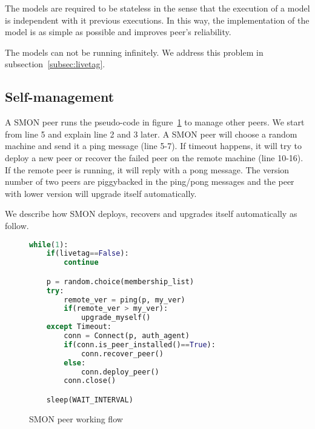 {The models are required to be stateless in the sense that
the execution of a model is independent with it previous
executions. In this way, the implementation of the model is
as simple as possible and improves peer's reliability.



The models can not be running infinitely. We address this
problem in subsection~\ref{subsec:livetag}.
}

\subsection{Self-management}

A SMON peer runs the pseudo-code in
figure~\ref{fig:peerflow} to manage other peers. We start
from line 5 and explain line 2 and 3 later. A SMON peer will
choose a random machine and send it a ping message (line
5-7). If timeout happens, it will try to deploy a new peer
or recover the failed peer on the remote machine (line
10-16). If the remote peer is running, it will reply with a
pong message. The version number of two peers are
piggybacked in the ping/pong messages and the peer with
lower version will upgrade itself automatically.

We describe how SMON deploys, recovers and upgrades itself
automatically as follow.


\begin{figure}
\centering
\begin{lstlisting}[language=Python,morekeywords={True,False},frame=tb,basicstyle=\footnotesize,numbers=right,numbersep=-5pt,numberstyle=\tiny]
while(1):
    if(livetag==False):
        continue

    p = random.choice(membership_list)
    try:
        remote_ver = ping(p, my_ver)
        if(remote_ver > my_ver):
            upgrade_myself()
    except Timeout:
        conn = Connect(p, auth_agent)
        if(conn.is_peer_installed()==True):
            conn.recover_peer()
        else:
            conn.deploy_peer()
        conn.close()

    sleep(WAIT_INTERVAL)
\end{lstlisting}
\caption{SMON peer working flow}
\label{fig:peerflow}
\end{figure}

